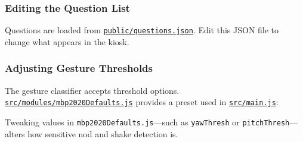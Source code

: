 \subsubsection{Editing the Question
List}\label{editing-the-question-list}

Questions are loaded from
\href{../public/questions.json}{\texttt{public/questions.json}}. Edit
this JSON file to change what appears in the kiosk.

\subsubsection{Adjusting Gesture
Thresholds}\label{adjusting-gesture-thresholds}

The gesture classifier accepts threshold options.
\href{../src/modules/mbp2020Defaults.js}{\texttt{src/modules/mbp2020Defaults.js}}
provides a preset used in \href{../src/main.js}{\texttt{src/main.js}}:

\begin{Shaded}
\begin{Highlighting}[]
\OperatorTok{=} \NormalTok{(\{}
    \OperatorTok{:}\OperatorTok{,}
    \OperatorTok{,}
    \OperatorTok{:} \OperatorTok{,}    
\NormalTok{\})}\OperatorTok{;}
 \OperatorTok{=} \OperatorTok{;}  
\end{Highlighting}
\end{Shaded}

Tweaking values in \texttt{mbp2020Defaults.js}---such as
\texttt{yawThresh} or \texttt{pitchThresh}---alters how sensitive nod
and shake detection is.
